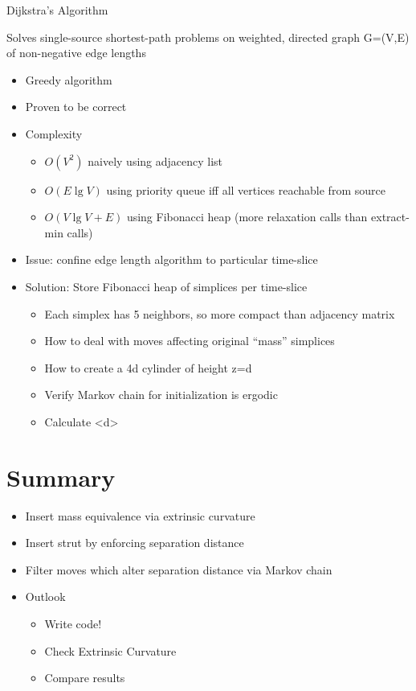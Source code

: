 \documentclass{article}
\begin{document}
Dijkstra's Algorithm \cite{cormen2001introduction}


Solves single-source shortest-path problems on weighted, directed
graph G=(V,E) of non-negative edge lengths

\begin{itemize}
\item Greedy algorithm
\item Proven to be correct
\item Complexity

\begin{itemize}
\item $O(V^{2})$ naively using adjacency list
\item $O(E\lg V)$ using priority queue iff all vertices reachable from
source
\item $O(V\lg V+E)$ using Fibonacci heap (more relaxation calls than extract-min
calls)
\end{itemize}
\item Issue: confine edge length algorithm to particular time-slice
\item Solution: Store Fibonacci heap of simplices per time-slice

\begin{itemize}
\item Each simplex has 5 neighbors, so more compact than adjacency matrix
\end{itemize}

\begin{itemize}
\item How to deal with moves affecting original ``mass'' simplices
\item How to create a 4d cylinder of height z=d
\item Verify Markov chain for initialization is ergodic
\item Calculate <d>
\end{itemize}
\end{itemize}

\section{Summary}
\begin{itemize}
\item Insert mass equivalence via extrinsic curvature
\item Insert strut by enforcing separation distance
\item Filter moves which alter separation distance via Markov chain
\item Outlook

\begin{itemize}
\item Write code!
\item Check Extrinsic Curvature
\item Compare results
\end{itemize}
\end{itemize}



\end{document}

